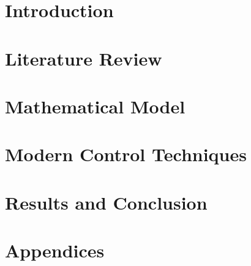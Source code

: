 \documentclass{book}
\begin{document}
\frontmatter





\mainmatter
\chapter{Introduction}


\chapter{Literature Review}


%


\chapter{Mathematical Model}


\chapter{Modern Control Techniques}


\chapter{Results and Conclusion}



\appendix
\chapter{Appendices}





\end{document}
